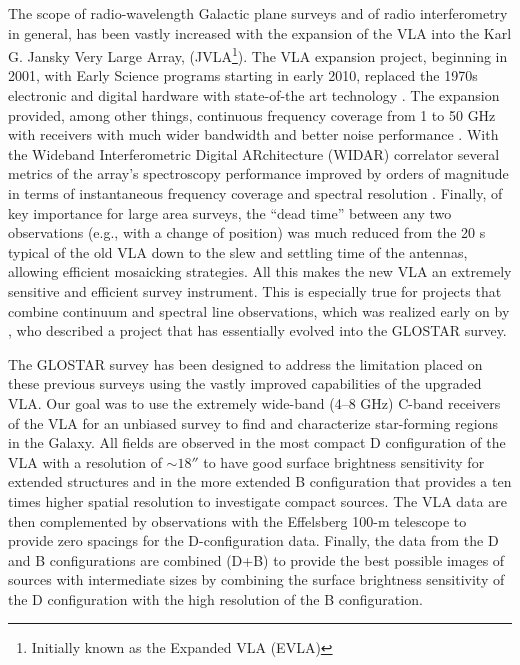 \documentclass{aa}
\begin{document}
The scope of radio-wavelength Galactic plane surveys and of radio interferometry in general, has been vastly increased with the expansion of the VLA into the Karl G. Jansky Very Large Array, (JVLA\footnote{Initially known as the  Expanded VLA (EVLA)}). The VLA expansion project, beginning in 2001, with Early Science programs starting in early 2010, replaced the  1970s electronic and digital hardware with state-of-the art technology \citep[for a description, see][]{Perley2011}. The expansion provided, among other things, continuous frequency coverage from 1 to 50 GHz with receivers with much wider bandwidth and better noise performance \citep[see Table 1 of][]{Perley2011}. With the Wideband Interferometric Digital ARchitecture (WIDAR) correlator several metrics of the array's spectroscopy performance improved by orders of magnitude in terms of instantaneous frequency coverage and spectral resolution \citep[see Table 2 of][]{Perley2011}. Finally, of key importance for large area surveys, the ``dead time'' between any two observations (e.g., with a change of position) was much reduced from the 20 s  typical of the old VLA down to the slew and settling time of the antennas, allowing efficient mosaicking strategies. All this makes the new VLA an  extremely sensitive and efficient survey instrument. This is especially true for projects that combine continuum and spectral line observations, which was realized early on by \cite{Menten2007}, who described a project that has essentially evolved into the GLOSTAR survey.

The GLOSTAR survey has been designed to address the limitation placed on these previous surveys using the vastly improved capabilities of the upgraded VLA. Our goal was to use the extremely wide-band (4--8 GHz) C-band receivers of the VLA for an unbiased survey to find and characterize  star-forming regions in the Galaxy. All fields are observed in the most compact D configuration of the VLA with a resolution of $\sim 18''$ to have good surface brightness sensitivity for extended structures and in the more extended B configuration that provides a ten times higher spatial resolution to investigate compact sources. The VLA data are then complemented by observations with the Effelsberg 100-m telescope to provide zero spacings for the D-configuration data. Finally, the data from the  D and B configurations are combined (D+B) to provide the best possible images of sources with intermediate sizes by combining the surface brightness sensitivity of the D configuration with the high resolution of the B configuration.
\end{document}
